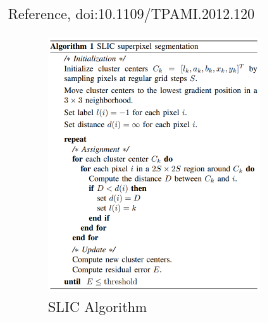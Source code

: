 \documentclass[11pt,letterpaper]{article}
\begin{document}
Reference, doi:10.1109/TPAMI.2012.120

\begin{figure}[H]
	\centering 
	\includegraphics[width=0.5\textwidth]{SLIC.png}
	\caption{SLIC Algorithm}
	\label{Figure2}
\end{figure}
\end{document}
